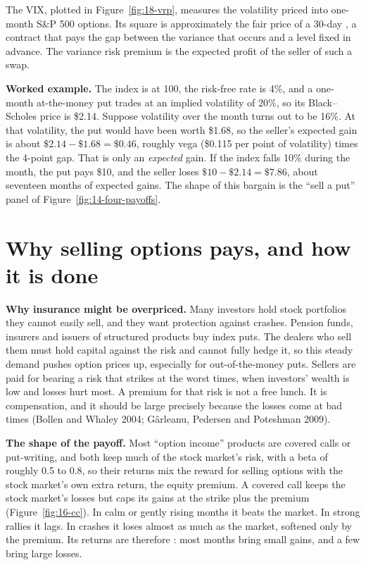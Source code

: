 The VIX,  plotted in Figure~\ref{fig:18-vrp}, measures the volatility priced into one-month S\&P 500 options. Its square is approximately the fair price of a 30-day , a contract that pays the gap between the variance that occurs and a level fixed in advance. The variance risk premium is the expected profit of the seller of such a swap.

\textbf{Worked example.} The index is at 100, the risk-free rate is 4\%, and a one-month at-the-money put trades at an implied volatility of 20\%, so its Black--Scholes price is \$2.14. Suppose volatility over the month turns out to be 16\%. At that volatility, the put would have been worth \$1.68, so the seller's expected gain is about $\$2.14 - \$1.68 = \$0.46$, roughly vega (\$0.115 per point of volatility) times the 4-point gap. That is only an \emph{expected} gain. If the index falls 10\% during the month, the put pays \$10, and the seller loses $\$10 - \$2.14 = \$7.86$, about seventeen months of expected gains. The shape of this bargain is the ``sell a put'' panel of Figure~\ref{fig:14-four-payoffs}.


\section{Why selling options pays, and how it is done}
\label{sec:16-how}

\textbf{Why insurance might be overpriced.} Many investors hold stock portfolios they cannot easily sell, and they want protection against crashes. Pension funds, insurers and issuers of structured products buy index puts. The dealers who sell them must hold capital against the risk and cannot fully hedge it, so this steady demand pushes option prices up, especially for out-of-the-money puts. Sellers are paid for bearing a risk that strikes at the worst times, when investors' wealth is low and losses hurt most. A premium for that risk is not a free lunch. It is compensation, and it should be large precisely because the losses come at bad times (Bollen and Whaley 2004; G\^arleanu, Pedersen and Poteshman 2009).


\textbf{The shape of the payoff.} Most ``option income'' products are covered calls or put-writing, and both keep much of the stock market's risk, with a beta of roughly 0.5 to 0.8, so their returns mix the reward for selling options with the stock market's own extra return, the equity premium. A covered call keeps the stock market's losses but caps its gains at the strike plus the premium (Figure~\ref{fig:16-cc}). In calm or gently rising months it beats the market. In strong rallies it lags. In crashes it loses almost as much as the market, softened only by the premium. Its returns are therefore : most months bring small gains, and a few bring large losses.

